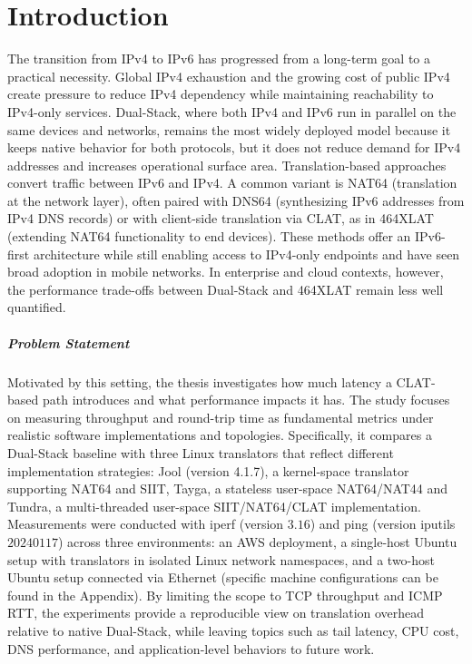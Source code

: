 \chapter{Introduction}
The transition from IPv4 to IPv6 has progressed from a long-term goal to a practical necessity. Global IPv4 exhaustion and the growing cost of public IPv4 create pressure to reduce IPv4 dependency while maintaining reachability to IPv4-only services\cite{7737362,LEVIN20141059}. 
Dual-Stack, where both IPv4 and IPv6 run in parallel on the same devices and networks, remains the most widely deployed model because it keeps native behavior for both protocols, but it does not reduce demand for IPv4 addresses and increases operational surface area\cite{rfc4213}. 
Translation-based approaches convert traffic between IPv6 and IPv4. A common variant is NAT64 (translation at the network layer), often paired with DNS64 (synthesizing IPv6 addresses from IPv4 DNS records) or with client-side translation via CLAT, as in 464XLAT (extending NAT64 functionality to end devices). These methods offer an IPv6-first architecture while still enabling access to IPv4-only endpoints and have seen broad adoption in mobile networks\cite{rfc6146,rfc6147,rfc6877}. In enterprise and cloud contexts, however, the performance trade-offs between Dual-Stack and 464XLAT remain less well quantified.


\paragraph{Problem Statement}

Motivated by this setting, 
the thesis investigates how much latency a CLAT-based path introduces and what performance impacts it has. The study focuses on measuring throughput and round-trip time as fundamental metrics under realistic software implementations and topologies. Specifically, it compares a Dual-Stack baseline 
with three Linux translators that reflect different implementation strategies: Jool (version 4.1.7), a kernel-space translator supporting NAT64 and SIIT\cite{jool_introduction}, Tayga, a stateless user-space NAT64/NAT44\cite{palrd_tayga_readme,Repas_Farnadi_Lencse_2014} and Tundra, a multi-threaded user-space SIIT/NAT64/CLAT implementation\cite{labuda_tundra_nat64}. Measurements were conducted with 
iperf (version $3.16$) and ping (version iputils $20240117$) across three environments: an AWS deployment, a single-host Ubuntu setup with translators in isolated Linux network namespaces, and a two-host Ubuntu setup connected via Ethernet (specific machine configurations can be found in the Appendix). By limiting the scope to TCP throughput and ICMP RTT, the experiments provide a reproducible view on translation overhead relative to native Dual-Stack, while leaving topics such as tail latency, CPU cost, DNS performance, and application-level behaviors to future work.


